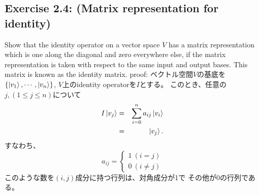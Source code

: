 \setcounter{equation}{0}
\begin{flushleft}
\section{\Large Exercise 2.4: (Matrix representation for identity)}
Show that the identity operator on a vector space $V$ has a matrix representation 
which is one along the diagonal and zero everywhere else, if the matrix representation
is taken with respect to the same input and output bases.
This matrix is known as the identity matrix.
\vspace{0.1in}
\newline
{\large proof:}
ベクトル空間$V$の基底を$\{\ket{v_1}, \cdots, \ket{v_n}\}$, 
$V$上のidentity operatorを$I$とする。
このとき、任意の$j, (1\leq j\leq n)$について
\begin{eqnarray*}
I\ket{v_j}  
&=& \sum_{i=0}^n a_{ij} \ket{v_i} \\
&=& \ket{v_j}.
\end{eqnarray*}
すなわち、
 \[a_{ij} = \begin{cases}
	1 ~(i = j)\\
	0 ~(i \neq j)
	\end{cases}
\]
このような数を$(i,j)$成分に持つ行列は、対角成分が1で
その他が0の行列である。
\end{flushleft}

